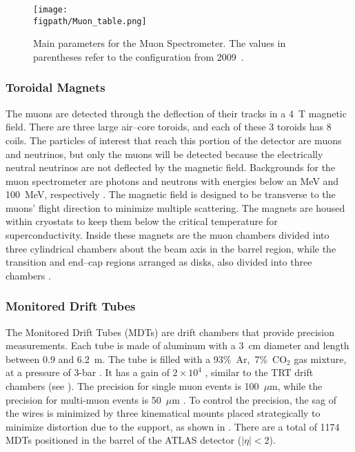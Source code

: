 \begin{figure}[h!tbp]
\centering
\texttt{[image: \\figpath/Muon\_table.png]}
\caption{Main parameters for the Muon Spectrometer.  The values in parentheses refer to the configuration from 2009~\cite{ATLAS_long}.}
\label{Muon-table}
\end{figure}

\subsubsection{Toroidal Magnets}

The muons are detected through the deflection of their tracks in a 4~T magnetic field.  There are three large air--core toroids, and each of these 3 toroids has 8 coils.  
The particles of interest that reach this portion of the detector are muons and neutrinos, but only the muons will be detected because the electrically neutral neutrinos are not deflected by the magnetic field.  
Backgrounds for the muon spectrometer are photons and neutrons with energies below an MeV and 100~MeV, respectively \cite{ATLAS_long}.  
The magnetic field is designed to be transverse to the muons' flight direction to minimize multiple scattering. The magnets are housed within cryostats to keep them below the critical temperature for superconductivity.  Inside these magnets are the muon chambers divided into three cylindrical chambers about the beam axis in the barrel region, while the transition and end--cap regions arranged as disks, also divided into three chambers \cite{ATLAS_long}.

\subsubsection{Monitored Drift Tubes}

The Monitored Drift Tubes (MDTs) are drift chambers that provide precision measurements. Each tube is made of aluminum with a 3~cm diameter and length between 0.9 and 6.2~m.  
The tube is filled with a 93\%~Ar,~7\%~CO$_2$ gas mixture, at a pressure of 3-bar \cite{ATLAS_long}.  It has a gain of $2\times10^4$ \cite{ATLAS_long}, similar to the TRT drift chambers (see ). The precision for single muon events is 100~$\mu$m, while the precision for multi-muon events is 50~$\mu$m \cite{ATLAS_long}. To control the precision, the sag of the wires is minimized by three kinematical mounts placed strategically to minimize distortion due to the support, as shown in . There are a total of 1174 MDTs positioned in the barrel of the ATLAS detector ($|\eta| < 2$).

